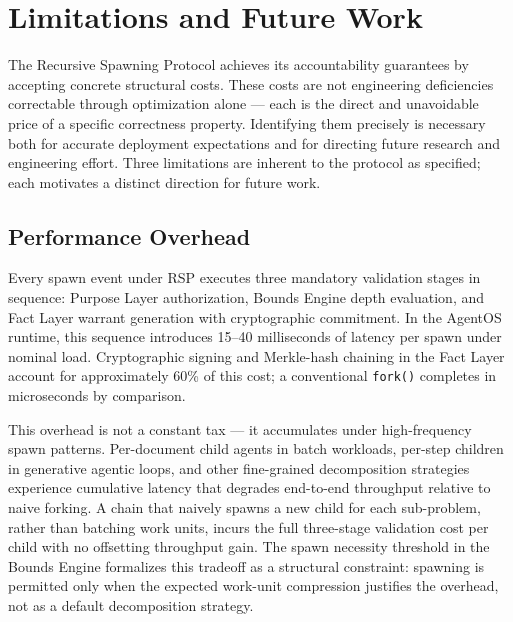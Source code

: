 \section{Limitations and Future Work}
\label{sec:rs-limitations}

The Recursive Spawning Protocol achieves its accountability guarantees by accepting concrete structural costs. These costs are not engineering deficiencies correctable through optimization alone — each is the direct and unavoidable price of a specific correctness property. Identifying them precisely is necessary both for accurate deployment expectations and for directing future research and engineering effort. Three limitations are inherent to the protocol as specified; each motivates a distinct direction for future work.

\subsection{Performance Overhead}
\label{sec:rs-perf-overhead}

Every spawn event under RSP executes three mandatory validation stages in sequence: Purpose Layer authorization, Bounds Engine depth evaluation, and Fact Layer warrant generation with cryptographic commitment. In the AgentOS runtime, this sequence introduces \numrange{15}{40} milliseconds of latency per spawn under nominal load. Cryptographic signing and Merkle-hash chaining in the Fact Layer account for approximately 60\% of this cost; a conventional \texttt{fork()} completes in microseconds by comparison.

This overhead is not a constant tax — it accumulates under high-frequency spawn patterns. Per-document child agents in batch workloads, per-step children in generative agentic loops, and other fine-grained decomposition strategies experience cumulative latency that degrades end-to-end throughput relative to naive forking. A chain that naively spawns a new child for each sub-problem, rather than batching work units, incurs the full three-stage validation cost per child with no offsetting throughput gain. The spawn necessity threshold in the Bounds Engine formalizes this tradeoff as a structural constraint: spawning is permitted only when the expected work-unit compression justifies the overhead, not as a default decomposition strategy.

